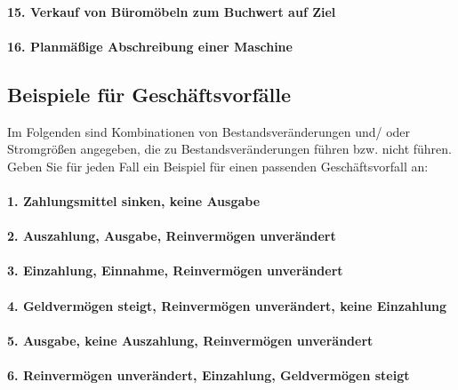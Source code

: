 \documentclass[paper=a4, fontsize=11pt]{scrartcl}
\numberwithin{equation}{section}
\numberwithin{figure}{section}
\numberwithin{table}{section}
\begin{document}
\paragraph{15. Verkauf von Büromöbeln zum Buchwert auf Ziel}

\paragraph{16. Planmäßige Abschreibung einer Maschine}


\subsection{Beispiele für Geschäftsvorfälle}

Im Folgenden sind Kombinationen von Bestandsveränderungen und/ oder Stromgrößen angegeben, die zu Bestandsveränderungen führen bzw. nicht führen. Geben Sie für jeden Fall ein Beispiel für einen passenden Geschäftsvorfall an: \\

\paragraph{1. Zahlungsmittel sinken, keine Ausgabe}

\paragraph{2. Auszahlung, Ausgabe, Reinvermögen unverändert}

\paragraph{3. Einzahlung, Einnahme, Reinvermögen unverändert}

\paragraph{4. Geldvermögen steigt, Reinvermögen unverändert, keine Einzahlung}

\paragraph{5. Ausgabe, keine Auszahlung, Reinvermögen unverändert}

\paragraph{6. Reinvermögen unverändert, Einzahlung, Geldvermögen steigt}
\end{document}
